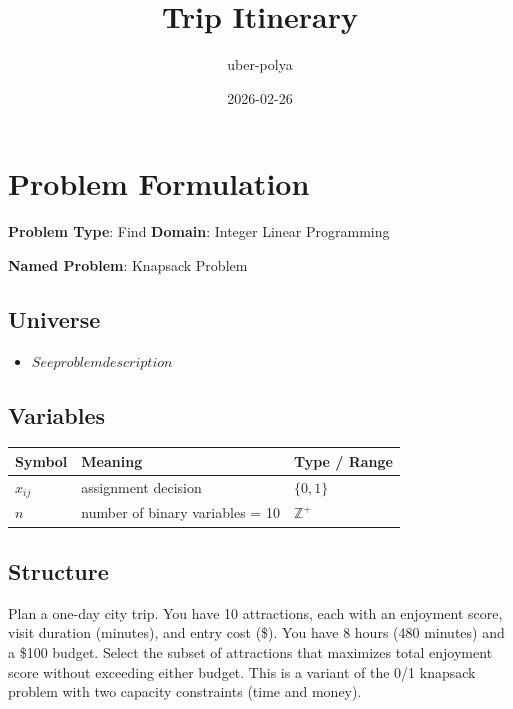 \documentclass[11pt, a4paper]{article}
\title{Trip Itinerary}
\author{uber-polya}
\date{2026-02-26}
\begin{document}
\maketitle
\tableofcontents
\newpage

\section{Problem Formulation}

\begin{polyamodel}

\textbf{Problem Type}: Find \hfill
\textbf{Domain}: Integer Linear Programming

\textbf{Named Problem}: Knapsack Problem

\end{polyamodel}

\subsection{Universe}

\begin{itemize}
  \item $See problem description$
\end{itemize}

\subsection{Variables}

\begin{longtable}{lll}
\toprule
\textbf{Symbol} & \textbf{Meaning} & \textbf{Type / Range} \\
\midrule
\endhead
$x_{ij}$ & assignment decision & $\{0, 1\}$ \\
$n$ & number of binary variables = 10 & $\mathbb{{Z}}^+$ \\
\bottomrule
\end{longtable}

\subsection{Structure}

Plan a one-day city trip. You have 10 attractions, each with an enjoyment score,
visit duration (minutes), and entry cost (\$). You have 8 hours (480 minutes) and
a \$100 budget. Select the subset of attractions that maximizes total enjoyment
score without exceeding either budget. This is a variant of the 0/1 knapsack
problem with two capacity constraints (time and money).
\end{document}
